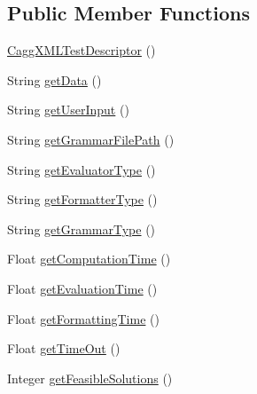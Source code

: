 \subsection*{Public Member Functions}
\begin{DoxyCompactItemize}
\item 
\hyperlink{classit_1_1emarolab_1_1cagg_1_1debugging_1_1result2XML_1_1CaggXMLTestDescriptor_a02ecbeddf0a99ef330eaded4af2f7800}{Cagg\-X\-M\-L\-Test\-Descriptor} ()
\item 
String \hyperlink{classit_1_1emarolab_1_1cagg_1_1debugging_1_1result2XML_1_1CaggXMLTestDescriptor_acf6ea6c456503adf80b746b2ab7d967f}{get\-Data} ()
\item 
String \hyperlink{classit_1_1emarolab_1_1cagg_1_1debugging_1_1result2XML_1_1CaggXMLTestDescriptor_aa17cbc16ad8479de25f4fd86bbc5c6c4}{get\-User\-Input} ()
\item 
String \hyperlink{classit_1_1emarolab_1_1cagg_1_1debugging_1_1result2XML_1_1CaggXMLTestDescriptor_ad5df8e167483fd18eed245de5591b47d}{get\-Grammar\-File\-Path} ()
\item 
String \hyperlink{classit_1_1emarolab_1_1cagg_1_1debugging_1_1result2XML_1_1CaggXMLTestDescriptor_ad138c6ab61acd372fe512e97e627f22a}{get\-Evaluator\-Type} ()
\item 
String \hyperlink{classit_1_1emarolab_1_1cagg_1_1debugging_1_1result2XML_1_1CaggXMLTestDescriptor_ac89614066978b28ccbdaccfeaa773ac4}{get\-Formatter\-Type} ()
\item 
String \hyperlink{classit_1_1emarolab_1_1cagg_1_1debugging_1_1result2XML_1_1CaggXMLTestDescriptor_a5a32e62c8864263ae583decfbde2ce6e}{get\-Grammar\-Type} ()
\item 
Float \hyperlink{classit_1_1emarolab_1_1cagg_1_1debugging_1_1result2XML_1_1CaggXMLTestDescriptor_ac386e098304a2a0db58c0aa9aa24f54b}{get\-Computation\-Time} ()
\item 
Float \hyperlink{classit_1_1emarolab_1_1cagg_1_1debugging_1_1result2XML_1_1CaggXMLTestDescriptor_a24b3c7442bae58f44e38a5757ab6afc5}{get\-Evaluation\-Time} ()
\item 
Float \hyperlink{classit_1_1emarolab_1_1cagg_1_1debugging_1_1result2XML_1_1CaggXMLTestDescriptor_a1e53fea763a6efe79d5bbec8435eff71}{get\-Formatting\-Time} ()
\item 
Float \hyperlink{classit_1_1emarolab_1_1cagg_1_1debugging_1_1result2XML_1_1CaggXMLTestDescriptor_a80feea1f9080d26dc426b4e02e4a6b55}{get\-Time\-Out} ()
\item 
Integer \hyperlink{classit_1_1emarolab_1_1cagg_1_1debugging_1_1result2XML_1_1CaggXMLTestDescriptor_a0ba527d309eee9a242d75b9fe21ee501}{get\-Feasible\-Solutions} ()

\end{DoxyCompactItemize}
